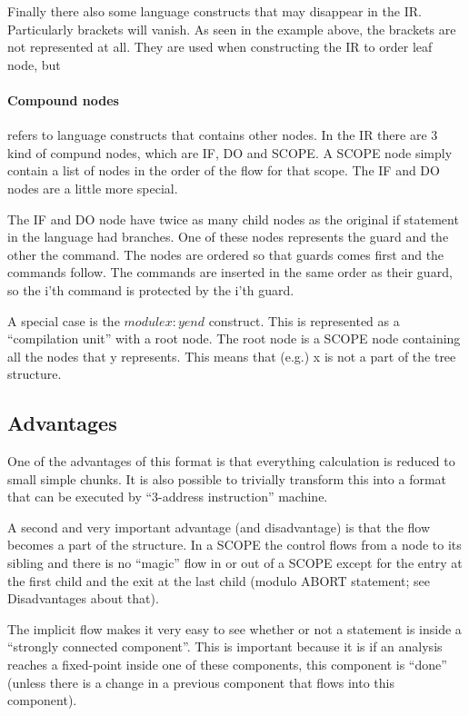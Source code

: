 Finally there also some language constructs that may disappear in the IR. Particularly
brackets will vanish. As seen in the example above, the brackets are not represented at
all. They are used when constructing the IR to order leaf node, but 

\paragraph*{Compound nodes}
refers to language constructs that contains other nodes. In the IR there are 3 kind of
compund nodes, which are IF, DO and SCOPE. A SCOPE node simply contain a list of nodes
in the order of the flow for that scope. The IF and DO nodes are a little more special.

  The IF and DO node have twice as many child nodes as the original if statement in the
language had branches. One of these nodes represents the guard and the other the command.
The nodes are ordered so that guards comes first and the commands follow. The commands
are inserted in the same order as their guard, so the i'th command is protected by the
i'th guard.

\docpar
A special case is the $module x : y end$ construct. This is represented as a ``compilation
unit'' with a root node. The root node is a SCOPE node containing all the nodes that y
represents. This means that (e.g.) x is not a part of the tree structure.

\subsection{Advantages}
One of the advantages of this format is that everything calculation is reduced to
small simple chunks. It is also possible to trivially transform this into a format
that can be executed by ``3-address instruction'' machine.

A second and very important advantage (and disadvantage) is that the flow becomes
a part of the structure. In a SCOPE the control flows from a node to its sibling
and there is no ``magic'' flow in or out of a SCOPE except for the entry at the
first child and the exit at the last child (modulo ABORT statement; see
Disadvantages about that).

  The implicit flow makes it very easy to see whether or not a statement is inside a
``strongly connected component''. This is important because it is if an analysis reaches
a fixed-point inside one of these components, this component is ``done'' (unless there is
a change in a previous component that flows into this component).


